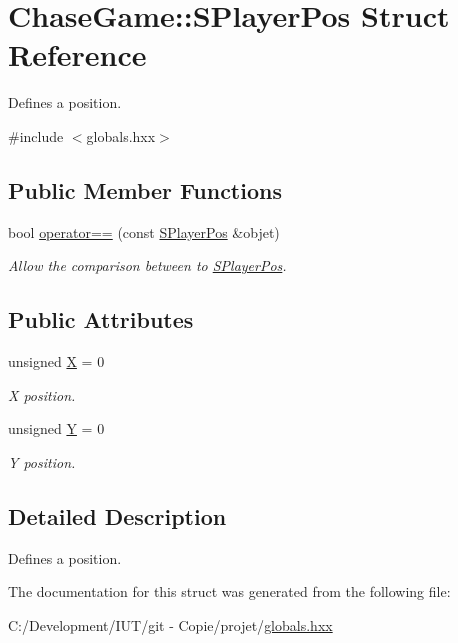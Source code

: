 \hypertarget{struct_chase_game_1_1_s_player_pos}{\section{Chase\-Game\-:\-:S\-Player\-Pos Struct Reference}
\label{struct_chase_game_1_1_s_player_pos}
}


Defines a position.  




{\ttfamily \#include $<$globals.\-hxx$>$}

\subsection*{Public Member Functions}
\begin{DoxyCompactItemize}
\item 
\hypertarget{struct_chase_game_1_1_s_player_pos_a16d84d116194f402b751f7265dd4fb91}{bool \hyperlink{struct_chase_game_1_1_s_player_pos_a16d84d116194f402b751f7265dd4fb91}{operator==} (const \hyperlink{struct_chase_game_1_1_s_player_pos}{S\-Player\-Pos} \&objet)}\label{struct_chase_game_1_1_s_player_pos_a16d84d116194f402b751f7265dd4fb91}

\begin{DoxyCompactList}\small\item\em Allow the comparison between to \hyperlink{struct_chase_game_1_1_s_player_pos}{S\-Player\-Pos}. \end{DoxyCompactList}\end{DoxyCompactItemize}
\subsection*{Public Attributes}
\begin{DoxyCompactItemize}
\item 
\hypertarget{struct_chase_game_1_1_s_player_pos_a28b353619ad10ef89da6308319b6ee39}{unsigned \hyperlink{struct_chase_game_1_1_s_player_pos_a28b353619ad10ef89da6308319b6ee39}{X} = 0}\label{struct_chase_game_1_1_s_player_pos_a28b353619ad10ef89da6308319b6ee39}

\begin{DoxyCompactList}\small\item\em X position. \end{DoxyCompactList}\item 
\hypertarget{struct_chase_game_1_1_s_player_pos_a0e20d9da2b1da89994a83e8acd72814c}{unsigned \hyperlink{struct_chase_game_1_1_s_player_pos_a0e20d9da2b1da89994a83e8acd72814c}{Y} = 0}\label{struct_chase_game_1_1_s_player_pos_a0e20d9da2b1da89994a83e8acd72814c}

\begin{DoxyCompactList}\small\item\em Y position. \end{DoxyCompactList}\end{DoxyCompactItemize}


\subsection{Detailed Description}
Defines a position. 

The documentation for this struct was generated from the following file\-:\begin{DoxyCompactItemize}
\item 
C\-:/\-Development/\-I\-U\-T/git -\/ Copie/projet/\hyperlink{globals_8hxx}{globals.\-hxx}\end{DoxyCompactItemize}

